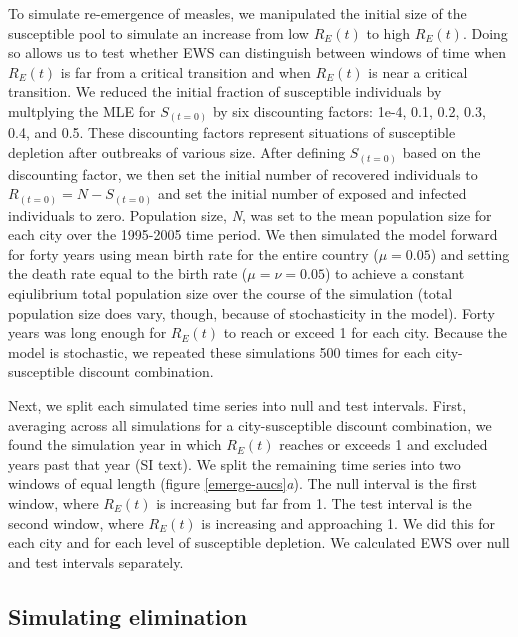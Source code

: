\documentclass[3p]{elsarticle} %
\begin{document}
To simulate re-emergence of measles, we manipulated the initial size of
the susceptible pool to simulate an increase from low \(R_E(t)\) to high
\(R_E(t)\). Doing so allows us to test whether EWS can distinguish
between windows of time when \(R_E(t)\) is far from a critical
transition and when \(R_E(t)\) is near a critical transition. We reduced
the initial fraction of susceptible individuals by multplying the MLE
for \(S_{(t=0)}\) by six discounting factors: 1e-4, 0.1, 0.2, 0.3, 0.4,
and 0.5. These discounting factors represent situations of susceptible
depletion after outbreaks of various size. After defining \(S_{(t=0)}\)
based on the discounting factor, we then set the initial number of
recovered individuals to \(R_{(t=0)} = N - S_{(t=0)}\) and set the
initial number of exposed and infected individuals to zero. Population
size, \emph{N}, was set to the mean population size for each city over
the 1995-2005 time period. We then simulated the model forward for forty
years using mean birth rate for the entire country (\(\mu = 0.05\)) and
setting the death rate equal to the birth rate (\(\mu = \nu = 0.05\)) to
achieve a constant eqiulibrium total population size over the course of
the simulation (total population size does vary, though, because of
stochasticity in the model). Forty years was long enough for \(R_E(t)\)
to reach or exceed 1 for each city. Because the model is stochastic, we
repeated these simulations 500 times for each city-susceptible discount
combination.

Next, we split each simulated time series into null and test intervals.
First, averaging across all simulations for a city-susceptible discount
combination, we found the simulation year in which \(R_E(t)\) reaches or
exceeds 1 and excluded years past that year (SI text). We split the
remaining time series into two windows of equal length (figure
\ref{emerge-aucs}\emph{a}). The null interval is the first window, where
\(R_E(t)\) is increasing but far from 1. The test interval is the second
window, where \(R_E(t)\) is increasing and approaching 1. We did this
for each city and for each level of susceptible depletion. We calculated
EWS over null and test intervals separately.

\hypertarget{simulating-elimination}{%
\subsection{Simulating elimination}\label{simulating-elimination}}
\end{document}
